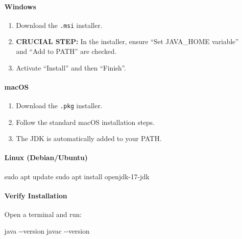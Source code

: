 \documentclass[
  justified,
  openright,
]{tufte-book}
\let\subsection\paragraph
\let\paragraph\paragraph
\newcommand{\CodeFuncTok}[1]{\textcolor{CodeKeyword}{#1}}           %
\newcommand{\CodeTypeTok}[1]{\textcolor{CodeType}{#1}}              %
\newenvironment{Shaded}{%
  \begin{mdframed}[style=TufteCode]%
}{%
  \end{mdframed}%
}
\let\subsection\paragraph
\let\paragraph\paragraph
\providecommand{\tightlist}{%
  \setlength{\itemsep}{0pt}\setlength{\parskip}{0pt}}
\begin{document}
\paragraph{Windows}\label{windows-3}

\begin{enumerate}
\def\labelenumi{\arabic{enumi}.}
\tightlist
\item
  Download the \texttt{.msi} installer.
\item
  \textbf{CRUCIAL STEP:} In the installer, ensure ``Set JAVA\_HOME
  variable'' and ``Add to PATH'' are checked.
\item
  Activate ``Install'' and then ``Finish''.
\end{enumerate}

\paragraph{macOS}\label{macos-3}

\begin{enumerate}
\def\labelenumi{\arabic{enumi}.}
\tightlist
\item
  Download the \texttt{.pkg} installer.
\item
  Follow the standard macOS installation steps.
\item
  The JDK is automatically added to your PATH.
\end{enumerate}

\paragraph{Linux (Debian/Ubuntu)}\label{linux-debianubuntu-2}

\begin{Shaded}
\begin{Highlighting}[]
\CodeFuncTok{sudo} apt update
\CodeFuncTok{sudo} apt install openjdk{-}17{-}jdk
\end{Highlighting}
\end{Shaded}

\subsection{Verify Installation}\label{verify-installation-1}

Open a terminal and run:

\begin{Shaded}
\begin{Highlighting}[]
java \CodeTypeTok{{-}{-}version}
javac \CodeTypeTok{{-}{-}version}
\end{Highlighting}
\end{Shaded}
\end{document}
